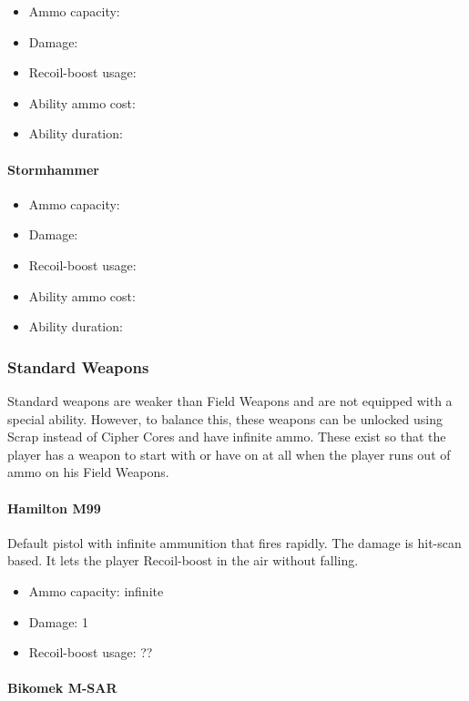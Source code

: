 \documentclass[12pt]{article}
\begin{document}
\begin{itemize}
	\item Ammo capacity: 
	\item Damage: 
	\item Recoil-boost usage: 
	\item Ability ammo cost: 
	\item Ability duration: 
\end{itemize}

\paragraph{Stormhammer}

\begin{itemize}
	\item Ammo capacity: 
	\item Damage: 
	\item Recoil-boost usage: 
	\item Ability ammo cost: 
	\item Ability duration: 
\end{itemize}

\subsubsection{Standard Weapons}

Standard weapons are weaker than Field Weapons and are not equipped with a special ability. However, to balance this, these weapons can be unlocked using Scrap instead of Cipher Cores and have infinite ammo.  These exist so that the player has a weapon to start with or have on at all when the player runs out of ammo on his Field Weapons.

\paragraph{Hamilton M99} 

Default pistol with infinite ammunition that fires rapidly. The damage is hit-scan based. It lets the player Recoil-boost in the air without falling.

\begin{itemize}
	\item Ammo capacity: infinite
	\item Damage: 1
	\item Recoil-boost usage: ??
\end{itemize}

\paragraph{Bikomek M-SAR} 
\end{document}

